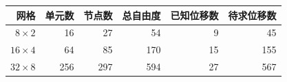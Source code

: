 \begin{tabular}{rrrrrr}\toprule 网格 & 单元数 & 节点数 & 总自由度 & 已知位移数 & 待求位移数\\\midrule
$8\times2$ & 16 & 27 & 54 & 9 & 45 \\
$16\times4$ & 64 & 85 & 170 & 15 & 155 \\
$32\times8$ & 256 & 297 & 594 & 27 & 567 \\
\bottomrule\end{tabular}
